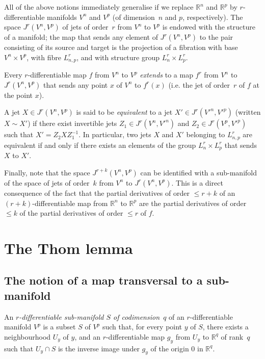 \documentclass{article}
\theoremstyle{plain}
\theoremstyle{definition}
\newcommand{\RR}{\mathbb{R}}
\renewcommand{\leq}{\leqslant}
\newcommand{\oldpage}[1]{\marginpar{\footnotesize$\Big\vert$ \textit{p.~#1}}}
\begin{document}
All of the above notions immediately generalise if we replace $\RR^n$ and $\RR^p$ by $r$-differentiable manifolds $V^n$ and $V^p$ (of dimension~$n$ and $p$, respectively).
The space $J^r(V^n,V^p)$ of jets of order~$r$ from $V^n$ to $V^p$ is endowed with the structure of a manifold;
the map that sends any element of $J^r(V^n,V^p)$ to the pair consisting of its source and target is the projection of a fibration with base $V^n\times V^p$, with fibre $L_{n,p}^r$, and with structure group $L_n^r\times L_p^r$.

Every $r$-differentiable map $f$ from $V^n$ to $V^p$ \emph{extends} to a map $f^r$ from $V^n$ to $J^r(V^n,V^p)$ that sends any point $x$ of $V^n$ to $f^r(x)$ (i.e. the jet of order~$r$ of $f$ at the point $x$).

A jet $X\in J^r(V^n,V^p)$ is said to be \emph{equivalent} to a jet $X'\in J^r(V'^n,V'^p)$ (written $X\sim X'$) if there exist invertible jets $Z_1\in J^r(V^n,V'^n)$ and $Z_2\in J^r(V^p,V'^p)$ such that $X'=Z_2XZ_1^{-1}$.
In particular, two jets $X$ and $X'$ belonging to $L_{n,p}^r$ are equivalent if and only if there exists an elements of the group $L_n^r\times L_p^r$ that sends $X$ to $X'$.

Finally, note that the space $J^{r+k}(V^n,V^p)$ can be identified with a sub-manifold of the space of jets of order~$k$ from $V^n$ to $J^r(V^n,V^p)$.
This is a direct consequence of the fact that the partial derivatives of order $\leq r+k$ of an $(r+k)$-differentiable map from $\RR^n$ to $\RR^p$ are the partial derivatives of order $\leq k$ of the partial derivatives of order $\leq r$ of $f$.


\section{The Thom lemma}
\label{section2}

\subsection*{The notion of a map transversal to a sub-manifold}

\oldpage{7-03}

An \emph{$r$-differentiable sub-manifold $S$ of codimension~$q$} of an $r$-differentiable manifold $V^p$ is a subset $S$ of $V^p$ such that, for every point $y$ of $S$, there exists a neighbourhood $U_y$ of $y$, and an $r$-differentiable map $g_y$ from $U_y$ to $\RR^q$ of rank~$q$ such that $U_y\cap S$ is the inverse image under $g_y$ of the origin $0$ in $\RR^q$.
\end{document}

